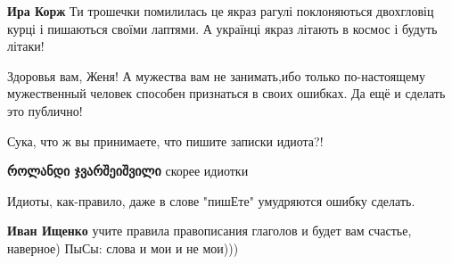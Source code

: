 \begin{itemize}
\begin{itemize}
\textbf{Ира Корж} Ти трошечки помилилась це якраз рагулі поклоняються двохгловіц курці і пишаються своїми лаптями. А українці якраз літають в космос і будуть літаки!

\end{itemize}

 

Здоровья вам, Женя! А мужества вам не занимать,ибо только по-настоящему
мужественный человек способен признаться в своих ошибках. Да ещё и сделать это
публично!


 
Сука, что ж вы принимаете, что пишите записки идиота?!

\begin{itemize}
 
\textbf{როლანდი ჯვარშეიშვილი} скорее идиотки

 
Идиоты, как-правило, даже в слове "пишЕте" умудряются ошибку сделать.

 
\textbf{Иван Ищенко} учите правила правописания глаголов и будет вам счастье, наверное)
ПыСы: слова и мои и не мои)))

 

\end{itemize}
\end{itemize}
